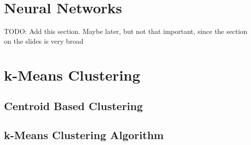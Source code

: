 \section{Neural Networks}
TODO: Add this section. Maybe later, but not that important, since the section on the slides is very broad
\section{k-Means Clustering}

\subsection{Centroid Based Clustering}
\subsection{k-Means Clustering Algorithm}
